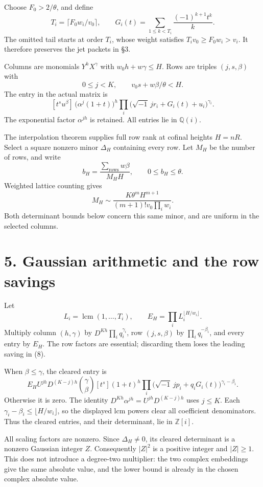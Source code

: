 \documentclass[11pt]{article}
\begin{document}
Choose \(F_0>2/\theta\), and define \[
T_i=\lceil F_0w_i/v_0\rceil,\qquad
G_i(t)=\sum_{1\le k<T_i}\frac{(-1)^{k+1}t^k}{k}.
\] The omitted tail starts at order \(T_i\), whose weight satisfies
\(T_iv_0\ge F_0w_i>v_i\). It therefore preserves the jet packets in §3.

Columns are monomials \(Y^hX^\gamma\) with \(w_0h+w\gamma\le H\). Rows
are triples \((j,s,\beta)\) with \[
0\le j<K,\qquad v_0s+w\beta/\theta<H.
\] The entry in the actual matrix is \[
[t^su^\beta]\,\bigl(\alpha^j(1+t)\bigr)^h
\prod_i\bigl(\sqrt{-1}\,jr_i+G_i(t)+u_i\bigr)^{\gamma_i}.
\tag{5}
\] The exponential factor \(\alpha^{jh}\) is retained. All entries lie
in \(\mathbb Q(i)\).

The interpolation theorem supplies full row rank at cofinal heights
\(H=nR\). Select a square nonzero minor \(\Delta_H\) containing every
row. Let \(M_H\) be the number of rows, and write \[
b_H=\frac{\sum_{\text{rows}}w\beta}{M_HH},\qquad 0\le b_H\le\theta.
\] Weighted lattice counting gives \[
M_H\sim\frac{K\theta^mH^{m+1}}{(m+1)!v_0\prod_iw_i}.
\tag{6}
\] Both determinant bounds below concern this same minor, and are
uniform in the selected columns.

\section{5. Gaussian arithmetic and the row
savings}\label{gaussian-arithmetic-and-the-row-savings}

Let \[
L_i=\operatorname{lcm}(1,\ldots,T_i),\qquad
E_H=\prod_iL_i^{\lfloor H/w_i\rfloor}.
\] Multiply column \((h,\gamma)\) by \(D^{Kh}\prod_iq_i^{\gamma_i}\),
row \((j,s,\beta)\) by \(\prod_iq_i^{-\beta_i}\), and every entry by
\(E_H\). The row factors are essential; discarding them loses the
leading saving in (8).

When \(\beta\le\gamma\), the cleared entry is \[
E_H U^{jh}D^{(K-j)h}\binom{\gamma}{\beta}
[t^s](1+t)^h
\prod_i\bigl(\sqrt{-1}\,jp_i+q_iG_i(t)\bigr)^{\gamma_i-\beta_i}.
\tag{7}
\] Otherwise it is zero. The identity
\(D^{Kh}\alpha^{jh}=U^{jh}D^{(K-j)h}\) uses \(j\le K\). Each
\(\gamma_i-\beta_i\le\lfloor H/w_i\rfloor\), so the displayed lcm powers
clear all coefficient denominators. Thus the cleared entries, and their
determinant, lie in \(\mathbb Z[i]\).

All scaling factors are nonzero. Since \(\Delta_H\ne0\), its cleared
determinant is a nonzero Gaussian integer \(Z\). Consequently \(|Z|^2\)
is a positive integer and \(|Z|\ge1\). This does not introduce a
degree-two multiplier: the two complex embeddings give the same absolute
value, and the lower bound is already in the chosen complex absolute
value.
\end{document}
